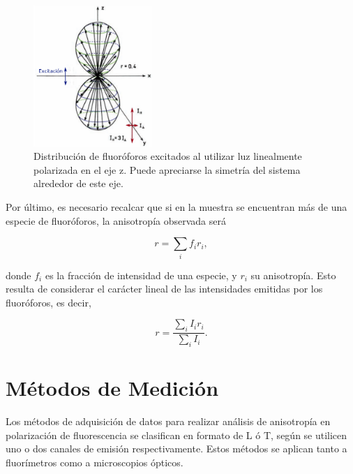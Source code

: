 \begin{figure}
    \centering
    \includegraphics[width=0.4\textwidth]{./img/FluoroforoExcitacion.png}
    \caption{Distribución de fluoróforos excitados al utilizar luz linealmente polarizada en el eje z. Puede apreciarse la simetría del sistema alrededor de este eje\cite{Lakowicz2006}.}
    \label{fig:FluoroforoExcitacion}
\end{figure}


Por último, es necesario recalcar que si en la muestra se encuentran más de una especie de fluoróforos, la anisotropía observada será

\begin{equation}
    r = \sum_i f_i r_i,
    \label{eq:anisotropiamezcla}
\end{equation}

\noindent donde $f_i$ es la fracción de intensidad de una especie, y $r_i$ su anisotropía\cite{Jablonski1960}. Esto resulta de considerar el carácter lineal de las intensidades emitidas por los fluoróforos, es decir,

\begin{equation}
    r = \frac{\sum_i I_i r_i}{\sum_i I_i}.
    \label{eq:anisotropiaInt}
\end{equation}


\section{Métodos de Medición}

Los métodos de adquisición de datos para realizar análisis de anisotropía en polarización de fluorescencia se clasifican en formato de L ó T, según se utilicen uno o dos canales de emisión respectivamente. Estos métodos se aplican tanto a fluorímetros como a microscopios ópticos.


